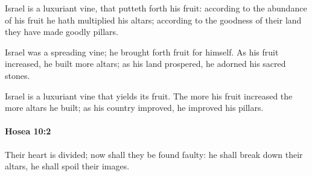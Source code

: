 			\begin{versebox}
					\item[BHS] 
					\item[LXX] 
					\item[ASV] Israel is a luxuriant vine, that putteth forth his fruit: according to the abundance of his fruit he hath multiplied his altars; according to the goodness of their land they have made goodly pillars.
					\item[NIV] Israel was a spreading vine; he brought forth fruit for himself. As his fruit increased, he built more altars; as his land prospered, he adorned his sacred stones.
					\item[NRSV] Israel is a luxuriant vine that yields its fruit. The more his fruit increased the more altars he built; as his country improved, he improved his pillars.
			\end{versebox}

		\paragraph{Hosea 10:2} %
			\label{HOSEA-10-2}

			Their heart is divided; now shall they be found faulty: he shall break down their altars, he shall spoil their images.

